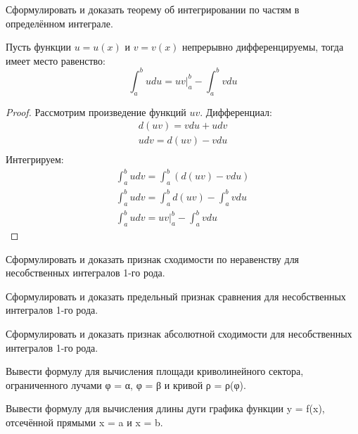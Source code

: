 \begin{question}
	Сформулировать и доказать теорему об интегрировании по частям в определённом интеграле.
\end{question}
\begin{theorem}
  Пусть функции $u = u(x)$ и  $v = v(x)$ непрерывно дифференцируемы, тогда имеет место равенство:  \[
  \int_a^b u du = uv \bigg|_a^b - \int_a^b v du
  \] 
\end{theorem}
\begin{proof}
  Рассмотрим произведение функций $uv$. Дифференциал:
  \begin{gather*}
    d(uv) = v du + u dv \\
    u dv = d(uv) - v du \\
  \end{gather*}
  Интегрируем:
  \begin{gather*}
    \int_a^b u dv = \int_a^b (d(uv) - vdu) \\
    \int_a^b u dv = \int_a^b d(uv) - \int_a^b v du \\
    \int_a^b u dv = uv \bigg|_a^b - \int_a^b v du
  \end{gather*}
\end{proof}


\begin{question}
	Сформулировать и доказать признак сходимости по неравенству для несобственных интегралов 1-го рода.
\end{question}

\begin{question}
	Сформулировать и доказать предельный признак сравнения для несобственных интегралов 1-го рода.
\end{question}

\begin{question}
	Сформулировать и доказать признак абсолютной сходимости для несобственных интегралов 1-го рода.
\end{question}

\begin{question}
	Вывести формулу для вычисления площади криволинейного сектора, ограниченного лучами φ = α, φ = β и кривой ρ = ρ(φ).
\end{question}

\begin{question}
	Вывести формулу для вычисления длины дуги графика функции y = f(x), отсечённой прямыми x = a и x = b.
\end{question}


